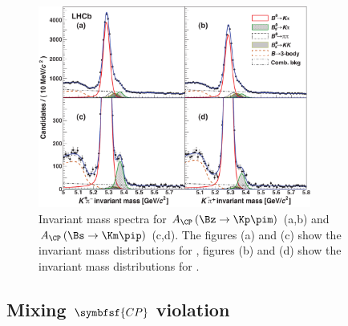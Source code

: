 \begin{figure}[tbp]
	\centering
	\includegraphics[width=0.8\textwidth]{03CPV/figs/DirectCPV.pdf}
	\caption{Invariant mass spectra for $A_{\CP}\left(\Bz\to\Kp\pim\right)$ (a,b) and $A_{\CP}\left(\Bs\to\Km\pip\right)$ (c,d). The figures (a) and (c) show the invariant mass distributions for \Kp\pim, figures (b) and (d) show the invariant mass distributions for \Km\pip.}
	\label{fig:DirectCPV}
\end{figure}


\subsection[head={Mixing \CP violation},tocentry={Mixing \CP violation}]{Mixing $\symbfsf{C{}P}$ violation}
\label{sec:MixingCPV}


